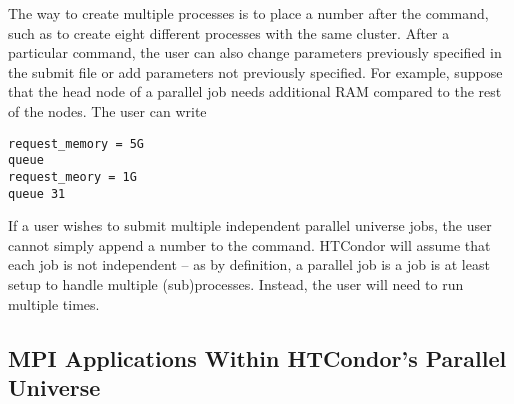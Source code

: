 The way to create multiple processes is to place a number after the 
command, such as  to create eight different processes with the 
same cluster. After a particular  command, the user can also change 
parameters previously specified in the submit file or add parameters not 
previously specified. For example, suppose that the head node of a parallel job 
needs additional RAM compared to the rest of the nodes. The user can write

\begin{verbatim}
request_memory = 5G
queue
request_meory = 1G
queue 31
\end{verbatim}

If a user wishes to submit multiple independent parallel universe jobs, the 
user cannot simply append a number to the  command. HTCondor will 
assume that each job is not independent -- as by definition, a parallel job is a 
job is at least setup to handle multiple (sub)processes. Instead, the user will
need to run  multiple times.




\subsection{\label{sec:parallel-mpi-submit}MPI Applications Within HTCondor's Parallel Universe}


